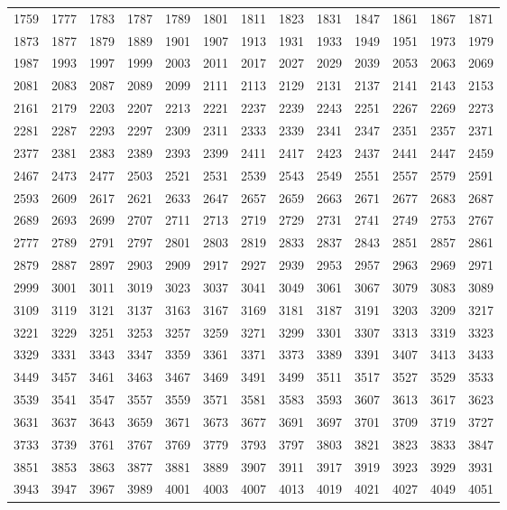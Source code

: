\documentclass[12pt, a6paper]{extarticle}
\begin{document}
\begin{longtable}{lllll lllll lll}
1759 &1777 &1783 &1787 &1789 &1801 &1811 &1823 &1831 &1847 &1861 &1867 &1871 \\
1873 &1877 &1879 &1889 &1901 &1907 &1913 &1931 &1933 &1949 &1951 &1973 &1979 \\
1987 &1993 &1997 &1999 &2003 &2011 &2017 &2027 &2029 &2039 &2053 &2063 &2069 \\
2081 &2083 &2087 &2089 &2099 &2111 &2113 &2129 &2131 &2137 &2141 &2143 &2153 \\
2161 &2179 &2203 &2207 &2213 &2221 &2237 &2239 &2243 &2251 &2267 &2269 &2273 \\
2281 &2287 &2293 &2297 &2309 &2311 &2333 &2339 &2341 &2347 &2351 &2357 &2371 \\
2377 &2381 &2383 &2389 &2393 &2399 &2411 &2417 &2423 &2437 &2441 &2447 &2459 \\
2467 &2473 &2477 &2503 &2521 &2531 &2539 &2543 &2549 &2551 &2557 &2579 &2591 \\
2593 &2609 &2617 &2621 &2633 &2647 &2657 &2659 &2663 &2671 &2677 &2683 &2687 \\
2689 &2693 &2699 &2707 &2711 &2713 &2719 &2729 &2731 &2741 &2749 &2753 &2767 \\
2777 &2789 &2791 &2797 &2801 &2803 &2819 &2833 &2837 &2843 &2851 &2857 &2861 \\
2879 &2887 &2897 &2903 &2909 &2917 &2927 &2939 &2953 &2957 &2963 &2969 &2971 \\
2999 &3001 &3011 &3019 &3023 &3037 &3041 &3049 &3061 &3067 &3079 &3083 &3089 \\
3109 &3119 &3121 &3137 &3163 &3167 &3169 &3181 &3187 &3191 &3203 &3209 &3217 \\
3221 &3229 &3251 &3253 &3257 &3259 &3271 &3299 &3301 &3307 &3313 &3319 &3323 \\
3329 &3331 &3343 &3347 &3359 &3361 &3371 &3373 &3389 &3391 &3407 &3413 &3433 \\
3449 &3457 &3461 &3463 &3467 &3469 &3491 &3499 &3511 &3517 &3527 &3529 &3533 \\
3539 &3541 &3547 &3557 &3559 &3571 &3581 &3583 &3593 &3607 &3613 &3617 &3623 \\
3631 &3637 &3643 &3659 &3671 &3673 &3677 &3691 &3697 &3701 &3709 &3719 &3727 \\
3733 &3739 &3761 &3767 &3769 &3779 &3793 &3797 &3803 &3821 &3823 &3833 &3847 \\
3851 &3853 &3863 &3877 &3881 &3889 &3907 &3911 &3917 &3919 &3923 &3929 &3931 \\
3943 &3947 &3967 &3989 &4001 &4003 &4007 &4013 &4019 &4021 &4027 &4049 &4051 \\

\end{longtable}
\end{document}
